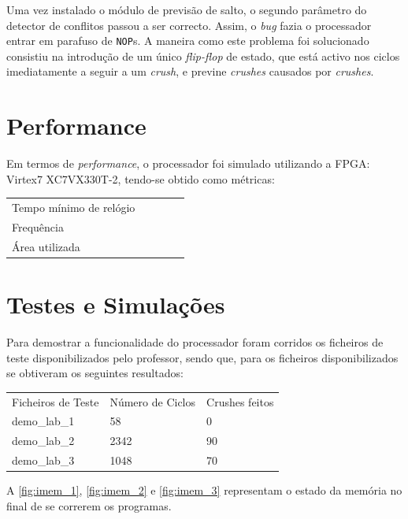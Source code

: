 \documentclass[a4paper]{article}
\begin{document}
	Uma vez instalado o módulo de previsão de salto, o segundo parâmetro do detector de conflitos passou a ser correcto. Assim, o \textit{bug} fazia o processador entrar em parafuso de \texttt{NOP}s. A maneira como este problema foi solucionado consistiu na introdução de um único \textit{flip-flop} de estado, que está activo nos ciclos imediatamente a seguir a um \textit{crush}, e previne \textit{crushes} causados por \textit{crushes}.
		
	\section{Performance}
	
	Em termos de \textit{performance}, o processador foi simulado utilizando a FPGA: Virtex7 XC7VX330T-2, tendo-se obtido como métricas:
	
	\begin{table}[h]
		\centering
		\begin{tabular}{lllll}
			Tempo mínimo de relógio &  \\
			Frequência &  \\
			Área utilizada &  \\
			
		\end{tabular}
	\end{table}
	  
	
	
	\section{Testes e Simulações} 
		
	Para demostrar a funcionalidade do processador foram corridos os ficheiros de teste disponibilizados pelo professor, sendo que, para os ficheiros disponibilizados se obtiveram os seguintes resultados:
	\begin{table}[h]
		\centering
		\begin{tabular}{lllll}
			Ficheiros de Teste & Número de Ciclos & \multicolumn{3}{l}{Crushes feitos} \\
			demo\_lab\_1 & 58 & 0 \\
			demo\_lab\_2 & 2342 & 90 \\
			demo\_lab\_3 & 1048 & 70
		\end{tabular}
	\end{table}
		A \autoref{fig:imem_1}, \autoref{fig:imem_2} e \autoref{fig:imem_3} representam o estado da memória no final de se correrem os programas.
		
\end{document}

